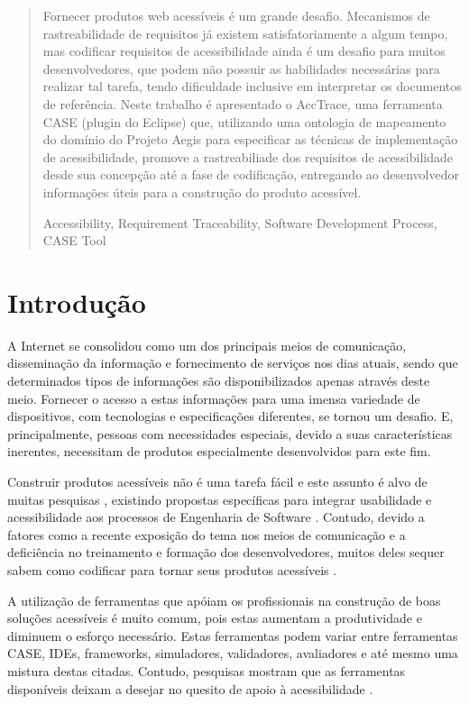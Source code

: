 \documentclass[runningheads,a4paper]{llncs}
\newcommand{\keywords}[1]{\par\addvspace\baselineskip
\noindent\keywordname\enspace\ignorespaces#1}
\begin{document}
\begin{abstract}

Fornecer produtos web acessíveis é um grande desafio. Mecanismos de rastreabilidade de requisitos já existem satisfatoriamente a algum tempo, mas codificar requisitos de acessibilidade ainda é um desafio para muitos desenvolvedores, que podem não possuir as habilidades necessárias para realizar tal tarefa, tendo dificuldade inclusive em interpretar os documentos de referência. Neste trabalho é apresentado o AccTrace, uma ferramenta CASE (plugin do Eclipse) que, utilizando uma ontologia de mapeamento do domínio do Projeto Aegis para especificar as técnicas de implementação de acessibilidade, promove a rastreabiliade dos requisitos de acessibilidade desde sua concepção até a fase de codificação, entregando ao desenvolvedor informações úteis para a construção do produto acessível.

\keywords{Accessibility, Requirement Traceability, Software Development
Process, CASE Tool}
\end{abstract}


\section{Introdução}

A Internet se consolidou como um dos principais meios de comunicação, disseminação da informação e fornecimento de serviços nos dias atuais, sendo que determinados tipos de informações são disponibilizados apenas através deste meio. Fornecer o acesso a estas informações para uma imensa variedade de dispositivos, com tecnologias e especificações diferentes, se tornou um desafio. E, principalmente, pessoas com necessidades especiais, devido a suas características inerentes, necessitam de produtos especialmente desenvolvidos para este fim.

Construir produtos acessíveis não é uma tarefa fácil e este assunto é alvo de muitas pesquisas \cite{lazar:04,brajnik:06,zeng:05}, existindo propostas específicas para integrar usabilidade e acessibilidade aos processos de Engenharia de Software \cite{springerlink:10.1007/978-3-642-02713-0,maia:10}. Contudo, devido a fatores como a recente exposição do tema nos meios de comunicação e a deficiência no treinamento e formação  dos desenvolvedores, muitos deles sequer sabem como codificar para tornar seus produtos acessíveis \cite{1630123,alves:11}.

A utilização de ferramentas que apóiam os profissionais na construção de boas soluções acessíveis é muito comum, pois estas aumentam a produtividade e diminuem o esforço necessário. Estas ferramentas podem variar entre ferramentas CASE, IDEs, frameworks, simuladores, validadores, avaliadores e até mesmo uma mistura destas citadas. Contudo, pesquisas mostram que as ferramentas disponíveis deixam a desejar no quesito de apoio à acessibilidade \cite{Trewin:2010:ACT:1805986.1806029}.
\end{document}
